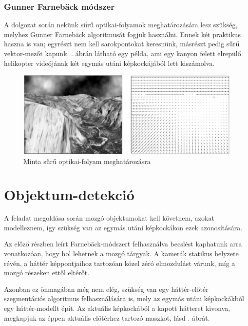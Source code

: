 \subsubsection{Gunner Farnebäck módszer}

A dolgozat során nekünk sűrű optikai-folyamok meghatározására lesz szükség, melyhez Gunner Farnebäck \cite{farneback} algoritmusát fogjuk használni. Ennek két praktikus haszna is van; egyrészt nem kell sarokpontokat keresnünk, másrészt pedig sűrű vektor-mezőt kapunk. . ábrán látható egy példa, ami egy kanyon felett elrepülő helikopter videójának két egymás utáni képkockájából lett kiszámolva.

\begin{figure}[tbh]
\centering
\includegraphics[width=420pt]{figures/farneback.png}
\caption{Minta sűrű optikai-folyam meghatározásra \cite{farneback} \label{fig:dense-of}}
\end{figure}

\section{Objektum-detekció}

A feladat megoldása során mozgó objektumokat kell követnem, azokat modelleznem, így szükség van az egymás utáni képkockákon ezek azonosítására.

Az előző részben leírt Farnebäck-módszert felhasználva becslést kaphatunk arra vonatkozóan, hogy hol lehetnek a mozgó tárgyak. A kamerák statikus helyzete révén, a háttér képpontjaihoz tartozóan közel zéró elmozdulást várunk, míg a mozgó részeken ettől eltérőt.

Azonban ez önmagában még nem elég, szükség van egy háttér-előtér szegmentációs algoritmus \cite{MOG} felhasználására is, mely az egymás utáni képkockákból egy háttér-modellt épít. Az aktuális képkockából a kapott hátteret kivonva, megkapjuk az éppen aktuális előtérhez tartozó maszkot, lásd . ábrát.

